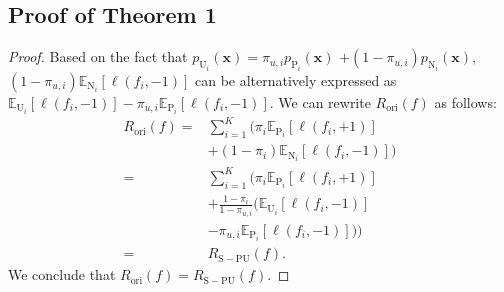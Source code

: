 \documentclass[11pt]{article}
\begin{document}
\subsection{Proof of Theorem 1}
\label{a0}
\begin{proof}
Based on the fact that $p_{\mathrm{U}_{i}}(\boldsymbol{x})=
\pi_{u,i}p_{\mathrm{P}_{i}}(\boldsymbol{x})$ $+(1-\pi_{u,i})p_{\mathrm{N}_{i}}(\boldsymbol{x})$, $(1-\pi_{u,i}) \mathbb{E}_{\mathrm{N}_{i}}[\ell(f_{i}, -1)]$ can be alternatively expressed as $\mathbb{E}_{\mathrm{U}_{i}}[\ell(f_{i}, -1)]-\pi_{u,i} \mathbb{E}_{\mathrm{P}_{i}}[\ell(f_{i}, -1)]$. We can rewrite $R_{\mathrm{ori}}(f)$ as follows:
\begin{equation}
\begin{aligned}\label{eq12}
R_{\mathrm{ori}}(f)=& \sum_{i=1}^{K}(\pi_{i} \mathbb{E}_{\mathrm{P}_{i}}[\ell(f_{i}, +1)] \\
&+(1-\pi_{i}) \mathbb{E}_{\mathrm{N}_{i}}[\ell(f_{i}, -1)]) \\
=& \sum_{i=1}^{K}(\pi_{i} \mathbb{E}_{\mathrm{P}_{i}}[\ell(f_{i}, +1)] \\
&+\frac{1-\pi_{i}}{1-\pi_{u,i}}(\mathbb{E}_{\mathrm{U}_{i}}[\ell(f_{i}, -1)]\\&-\pi_{u,i} \mathbb{E}_{\mathrm{P}_{i}}[\ell(f_{i}, -1)])) \\
=& R_{\mathrm{S-PU}}(f).
\end{aligned}
\end{equation}
We conclude that $R_{\mathrm{ori}}(f)=R_{\mathrm{S-PU}}(f)$.
\end{proof}
\end{document}
